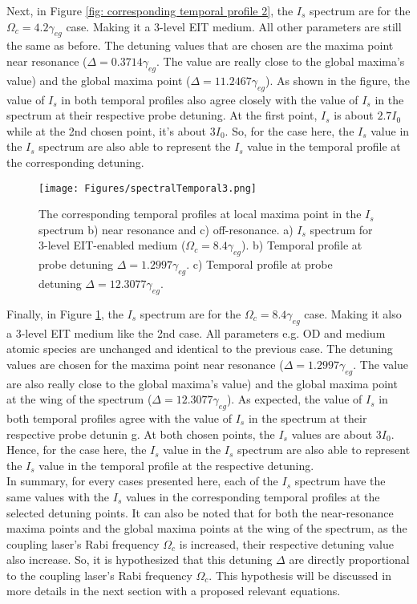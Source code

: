 Next, in Figure \ref{fig: corresponding temporal profile 2}, the $I_{s}$ spectrum are for the $\Omega_{c} = 4.2\gamma_{eg}$ case. Making it a 3-level EIT medium. All other parameters are still the same as before. The detuning values that are chosen are the maxima point near resonance ($\Delta = 0.3714\gamma_{eg}$. The value are really close to the global maxima's value) and the global maxima point ($\Delta = 11.2467\gamma_{eg}$). As shown in the figure, the value of $I_{s}$ in both temporal profiles also agree closely with the value of $I_{s}$ in the spectrum at their respective probe detuning. At the first point, $I_{s}$ is about $2.7I_{0}$ while at the 2nd chosen point, it's about $3I_{0}$. So, for the case here, the $I_{s}$ value in the $I_{s}$ spectrum are also able to represent the $I_{s}$ value in the temporal profile at the corresponding detuning.

\begin{figure}[h!]
    \centering
    \texttt{[image: Figures/spectralTemporal3.png]}
    \caption{The corresponding temporal profiles at local maxima point in the $I_{s}$ spectrum b) near resonance and c) off-resonance. a) $I_{s}$ spectrum for 3-level EIT-enabled medium ($\Omega_{c} = 8.4\gamma_{eg}$). b) Temporal profile at probe detuning $\Delta = 1.2997\gamma_{eg}$. c) Temporal profile at probe detuning $\Delta = 12.3077\gamma_{eg}$.}
    \label{fig: corresponding temporal profile 3}
\end{figure}

Finally, in Figure \ref{fig: corresponding temporal profile 3}, the $I_{s}$ spectrum are for the $\Omega_{c} = 8.4\gamma_{eg}$ case. Making it also a 3-level EIT medium like the 2nd case. All parameters e.g. OD and medium atomic species are unchanged and identical to the previous case. The detuning values are chosen for the maxima point near resonance ($\Delta = 1.2997\gamma_{eg}$. The value are also really close to the global maxima's value) and the global maxima point at the wing of the spectrum ($\Delta = 12.3077\gamma_{eg}$). As expected, the value of $I_{s}$ in both temporal profiles agree with the value of $I_{s}$ in the spectrum at their respective probe detunin  g. At both chosen points, the $I_{s}$ values are about $3I_{0}$. Hence, for the case here, the $I_{s}$ value in the $I_{s}$ spectrum are also able to represent the $I_{s}$ value in the temporal profile at the respective detuning.\\

In summary, for every cases presented here, each of the $I_{s}$ spectrum have the same values with the $I_{s}$ values in the corresponding temporal profiles at the selected detuning points. It can also be noted that for both the near-resonance maxima points and the global maxima points at the wing of the spectrum, as the coupling laser's Rabi frequency $\Omega_{c}$ is increased, their respective detuning value also increase. So, it is hypothesized that this detuning $\Delta$ are directly proportional to the coupling laser's Rabi frequency $\Omega_{c}$. This hypothesis will be discussed in more details in the next section with a proposed relevant equations.


